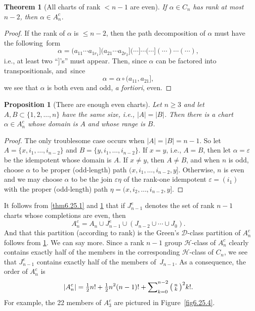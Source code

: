 \documentclass{surv-l}
\numberwithin{equation}{section}
\numberwithin{table}{section}
\numberwithin{figure}{section}
\theoremstyle{plain}
\newtheorem{theorem}[equation]{Theorem}
\newtheorem{proposition}[equation]{Proposition}
\theoremstyle{definition}
\begin{document}
\begin{theorem}[All charts of rank $<n -1$ are even]\label{thm6.25.2} If
$\alpha\in C_{n}$ has rank at most $n -2$, then $\alpha\in
A_{n}^{c}$.
\end{theorem}

\begin{proof} If the rank of $\alpha$ is $\leq n -2$, then the path
decomposition of $\alpha$ must have the following~form
\[
\alpha=(a_{11}\cdots a_{1r_{1}}](a_{21}\cdots a_{2r_{2}}](\cdots]\cdots(\cdots](\cdots)\cdots(\cdots),
\]
i.e., at least two ``]'s'' must appear. Then, since $\alpha$ can
be factored into transpositionals, and~since
\[
\alpha=\alpha\circ(a_{11}, a_{21}],
\]
we see that $\alpha$ is both even and odd, \emph{a fortiori},
even.
\end{proof}

\begin{proposition}[There are enough even charts]\label{prop6.25.3}
Let $n \geq 3$ and let $A, B\subset\{1,2,\ldots, n\}$ have the
same size, i.e., $|A|=|B|$. Then there is a chart $\alpha\in
A_{n}^{c}$ whose domain is $A$ and whose range is $B$.
\end{proposition}

\begin{proof} The only troublesome case occurs when $|A|=|B|=n -1$. So
let $A=\{x, i_{1},\ldots, i_{n-2}\}$ and $B=\{y, i_{1},\ldots,
i_{n-2}\}$. If $x=y$, i.e., $A=B$, then let $\alpha=\varepsilon$
be the idempotent whose domain is $A$. If $x\neq y$, then $A\neq B$,
and when $n$ is odd, choose $\alpha$ to be proper (odd-length)
path $(x, i_{1},\ldots, i_{n-2}, y]$. Otherwise, $n$ is even and
we may choose $\alpha$ to be the join $\varepsilon\eta$ of the
rank-one idempotent $\varepsilon =(i_{1})$ with the proper
(odd-length) path $\eta=(x, i_{2},\ldots, i_{n-2}, y].$
\end{proof}

It follows from \ref{thm6.25.1} and \ref{thm6.25.2} that if
$J_{n-1}^{e}$ denotes the set of rank $n-1$ charts whose
completions are even, then
\[
A_{n}^{c}=A_{n}\cup J_{n-1}^{e}\cup(J_{n-2}\cup\cdots\cup J_{0}).
\]
And that this partition (according to rank) is the Green's
$\mathcal{D}$-class partition of $A_{n}^{c}$ follows from
\ref{prop6.25.3}. We can say more. Since a rank $n-1$ group
$\mathcal{H}$-class of $A_{n}^{c}$ clearly contains exactly half
of the members in the corresponding $\mathcal{H}$-class of
$C_{n}$, we see that $J_{n-1}^{e}$ contains exactly half of the
members of~$J_{n-1}$. As a consequence, the order of $A_{n}^{c}$
is
\[
|A_{n}^{c}|=\tfrac{1}{2}n!+\tfrac{1}{2}n^{2} (n-1)!+\sum\nolimits_{k=0}^{n-2}\big(\kern0.5pt\begin{smallmatrix}
n\\
k\end{smallmatrix}\kern0.5pt\big)^2 {k}!.
\]
For example, the 22 members of $A_{3}^{c}$ are pictured in
Figure~\ref{fig6.25.4}.
\end{document}
